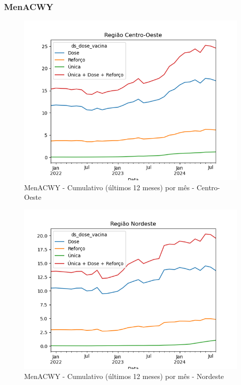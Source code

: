 \documentclass[12pt]{article}
\begin{document}
\subsubsection{MenACWY}
\begin{figure}[H]
    \centering
    \includegraphics[width=0.85\linewidth]{imagens/MenACWY-Centro-Oeste-Cumulativo-mes}
    \caption{MenACWY - Cumulativo (últimos 12 meses) por mês - Centro-Oeste}
    \label{fig:MenACWY-centro-oeste-cumulativo}
\end{figure}
\begin{figure}[H]
    \centering
    \includegraphics[width=0.85\linewidth]{imagens/MenACWY-Nordeste-Cumulativo-mes}
    \caption{MenACWY - Cumulativo (últimos 12 meses) por mês - Nordeste}
    \label{fig:MenACWY-nordeste-cumulativo-mes}
\end{figure}
\end{document}
